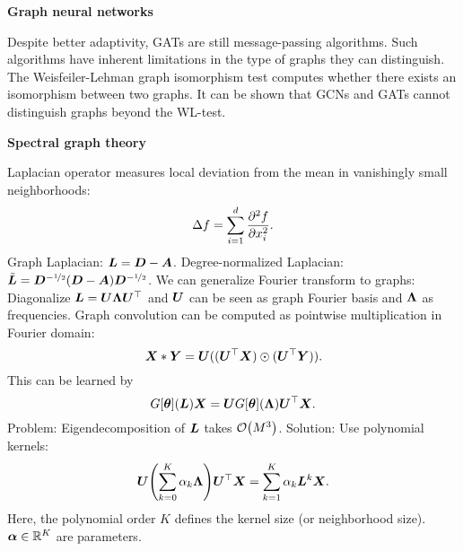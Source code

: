 \documentclass[10pt]{article}
\newenvironment{topic}[1]
{\textbf{\sffamily \colorbox{black}{\rlap{\textbf{\textcolor{white}{#1}}}\hspace{\linewidth}\hspace{-2\fboxsep}}}}
{}
\newenvironment{subtopic}[1]
{\begin{center}\textbf{\sffamily #1}\end{center}}
{}
\begin{document}
\begin{multicols*}{3}
\begin{topic}{Geometric deep learning}
\begin{subtopic}{Graph neural networks}
            Despite better adaptivity, GATs are still message-passing algorithms. Such algorithms have inherent
            limitations in the type of graphs they can distinguish. The Weisfeiler-Lehman graph isomorphism
            test computes whether there exists an isomorphism between two graphs. It can be shown that GCNs and
            GATs cannot distinguish graphs beyond the WL-test.
        \end{subtopic}

        \begin{subtopic}{Spectral graph theory}
            Laplacian operator measures local deviation from the mean in vanishingly small neighborhoods: \[
                \Delta f = \sum_{i=1}^{d} \pdv[order=2]{f}{x_i}.
            \]
            Graph Laplacian: $\bm{L} = \bm{D} - \bm{A}$. Degree-normalized Laplacian: $\tilde{\bm{L}} =
                \bm{D}^{-\nicefrac{1}{2}} (\bm{D} - \bm{A}) \bm{D}^{-\nicefrac{1}{2}}$. We can generalize
            Fourier transform to graphs: Diagonalize $\bm{L} = \bm{U} \bm{\Lambda} \bm{U}^\top$ and
            $\bm{U}$ can be seen as graph Fourier basis and $\bm{\Lambda}$ as frequencies. Graph convolution
            can be computed as pointwise multiplication in Fourier domain: \[
                \bm{X} * \bm{Y} = \bm{U}((\bm{U}^\top\bm{X}) \odot (\bm{U}^\top \bm{Y})).
            \]
            This can be learned by \[
                G[\bm{\theta}](\bm{L}) \bm{X} = \bm{U} G[\bm{\theta}](\bm{\Lambda}) \bm{U}^\top \bm{X}.
            \]
            Problem: Eigendecomposition of $\bm{L}$ takes $\bigo{M^3}$. Solution: Use polynomial kernels: \[
                \mat{U} \lft( \sum_{k=0}^{K} \alpha_k \mat{\Lambda} \rgt) \transpose{\mat{U}} \mat{X} = \sum_{k=1}^{K} \alpha_k \mat{L}^k \mat{X}.
            \]
            Here, the polynomial order $K$ defines the kernel size (or neighborhood size). $\bm{\alpha} \in
                \mathbb{R}^K$ are parameters.
        \end{subtopic}

    \end{topic}

    \begin{topic}{Tricks of the trade}


\end{topic}
\end{multicols*}
\end{document}
